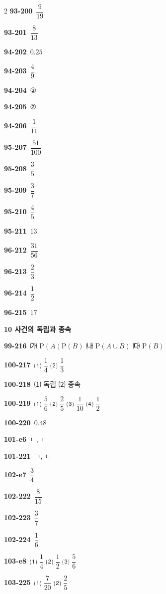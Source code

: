 \documentclass[10pt,a4paper]{article}
\begin{document}
\begin{multicols}{2}
\noindent\textbf{93-200}\ $\dfrac{9}{19}$\par
\noindent\textbf{93-201}\ $\dfrac{8}{13}$\par
\noindent\textbf{94-202}\ $0.25$\par
\noindent\textbf{94-203}\ $\dfrac{4}{9}$\par
\noindent\textbf{94-204}\ ②\par
\noindent\textbf{94-205}\ ②\par
\noindent\textbf{94-206}\ $\dfrac{1}{11}$\par
\noindent\textbf{95-207}\ $\dfrac{51}{100}$\par
\noindent\textbf{95-208}\ $\dfrac{3}{5}$\par
\noindent\textbf{95-209}\ $\dfrac{3}{7}$\par
\noindent\textbf{95-210}\ $\dfrac{4}{5}$\par
\noindent\textbf{95-211}\ $13$\par
\noindent\textbf{96-212}\ $\dfrac{31}{56}$\par
\noindent\textbf{96-213}\ $\dfrac{2}{3}$\par
\noindent\textbf{96-214}\ $\dfrac{1}{2}$\par
\noindent\textbf{96-215}\ $17$\par
\noindent\textbf{10 사건의 독립과 종속}\par\smallskip
\noindent\textbf{99-216}\ ㈎ $\mathrm{P}(A)\mathrm{P}(B)$ ㈏ $\mathrm{P}(A\cup B)$ ㈐ $\mathrm{P}(B)$\par
\noindent\textbf{100-217}\ ⑴ $\dfrac{1}{4}$ ⑵ $\dfrac{1}{3}$\par
\noindent\textbf{100-218}\ ⑴ 독립 ⑵ 종속\par
\noindent\textbf{100-219}\ ⑴ $\dfrac{5}{6}$ ⑵ $\dfrac{2}{5}$ ⑶ $\dfrac{1}{10}$ ⑷ $\dfrac{1}{2}$\par
\noindent\textbf{100-220}\ $0.48$\par
\noindent\textbf{101-e6}\ ㄴ, ㄷ\par
\noindent\textbf{101-221}\ ㄱ, ㄴ\par
\noindent\textbf{102-e7}\ $\dfrac{3}{4}$\par
\noindent\textbf{102-222}\ $\dfrac{8}{15}$\par
\noindent\textbf{102-223}\ $\dfrac{3}{7}$\par
\noindent\textbf{102-224}\ $\dfrac{1}{6}$\par
\noindent\textbf{103-e8}\ ⑴ $\dfrac{1}{4}$ ⑵ $\dfrac{1}{2}$ ⑶ $\dfrac{5}{6}$\par
\noindent\textbf{103-225}\ ⑴ $\dfrac{7}{20}$ ⑵ $\dfrac{2}{5}$\par

\end{multicols}
\end{document}
